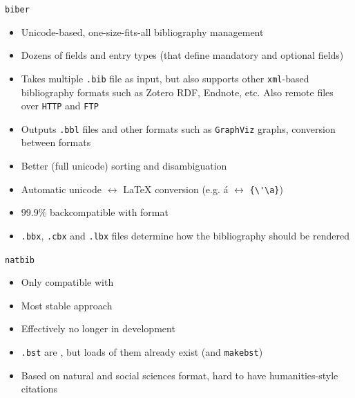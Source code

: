\documentclass[english]{beamer}
\let\olditem\item
\renewcommand{\item}{\setlength{\itemsep}{\fill}\olditem}
\let\textttt\texttt
\renewcommand{\texttt}[1]{\colorbox{gray!10}{\textttt{#1}}}
\begin{document}
\begin{frame}[fragile]{\texttt{biber}}
    \begin{itemize}
        \item Unicode-based, one-size-fits-all bibliography management
        \item Dozens of fields and entry types (that define mandatory and optional fields)
        \item Takes multiple \texttt{.bib} file as input, but also supports other \texttt{xml}-based bibliography formats such as Zotero RDF, Endnote, etc. Also remote files over \texttt{HTTP} and \texttt{FTP}
        \item Outputs \texttt{.bbl} files and other formats such as \texttt{GraphViz} graphs, conversion between formats
        \item Better (full unicode) sorting and disambiguation
        \item Automatic unicode $\leftrightarrow$ \LaTeX{}  conversion (e.g. á $\leftrightarrow$ \verb|{\'\a}|)
        \item $99.9\%$ backcompatible with  format
        \item \texttt{.bbx}, \texttt{.cbx} and \texttt{.lbx} files determine how the bibliography should be rendered 
    \end{itemize}
\end{frame}

\begin{frame}{\texttt{natbib}}
    \begin{itemize}
        \item Only compatible with 
        \item Most stable approach
        \item Effectively no longer in development
        \item \texttt{.bst} are , but loads of them already exist (and \texttt{makebst})
        \item Based on natural and social sciences format, hard to have humanities-style citations
    \end{itemize}
\end{frame}
\end{document}
